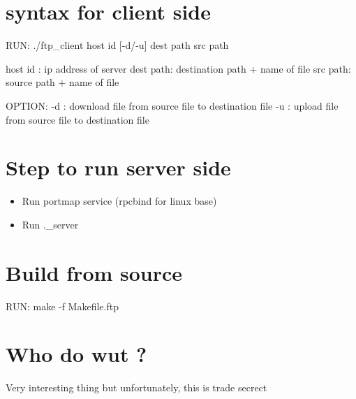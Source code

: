 \documentclass{article}
\begin{document}
\section{syntax for client side}
RUN: ./ftp_client {host id} [-d/-u] {dest path} {src path} \newline

host id : ip address of server
dest path: destination path + name of file
src path: source path + name of file

OPTION:
-d : download file from source file to destination file
-u : upload file from source file to destination file

\section{Step to run server side}
\begin{itemize}
	\item Run portmap service (rpcbind for linux base)
	\item Run .\ftp_server
\end{itemize}

\section{Build from source}
RUN: make -f Makefile.ftp

\section{Who do wut ?}
Very interesting thing but unfortunately, this is trade secrect
\end{document}
